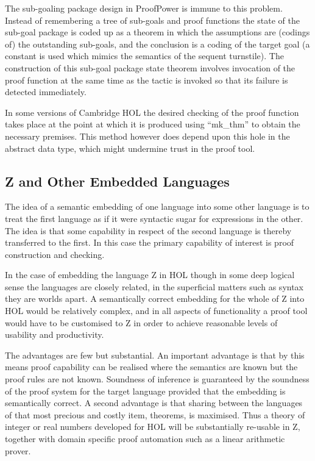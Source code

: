 \documentclass[10pt,titlepage]{book}
\def\Product{ProofPower}
\begin{document}
The sub-goaling package design in {\Product} is immune to this problem.
Instead of remembering a tree of sub-goals and proof functions the state of the sub-goal package is coded up as a theorem in which the assumptions are (codings of) the outstanding sub-goals, and the conclusion is a coding of the target goal (a constant is used which mimics the semantics of the sequent turnstile).
The construction of this sub-goal package state theorem involves invocation of the proof function at the same time as the tactic is invoked so that its failure is detected immediately.

In some versions of Cambridge HOL the desired checking of the proof function takes place at the point at which it is produced using ``mk\_thm'' to obtain the necessary premises.
This method however does depend upon this hole in the abstract data type, which might undermine trust in the proof tool.

\subsection{Z and Other Embedded Languages}

The idea of a semantic embedding of one language into some other language is to treat the first language as if it were syntactic sugar for expressions in the other.
The idea is that some capability in respect of the second language is thereby transferred to the first.
In this case the primary capability of interest is proof construction and checking.

In the case of embedding the language Z in HOL though in some deep logical sense the languages are closely related, in the superficial matters such as syntax they are worlds apart.
A semantically correct embedding for the whole of Z into HOL would be relatively complex, and in all aspects of functionality a proof tool would have to be customised to Z in order to achieve reasonable levels of usability and productivity.

The advantages are few but substantial.
An important advantage is that by this means proof capability can be realised where the semantics are known but the proof rules are not known.
Soundness of inference is guaranteed by the soundness of the proof system for the target language provided that the embedding is semantically correct.
A second advantage is that sharing between the languages of that most precious and costly item, theorems, is maximised.
Thus a theory of integer or real numbers developed for HOL will be substantially re-usable in Z, together with domain specific proof automation such as a linear arithmetic prover.
\end{document}
